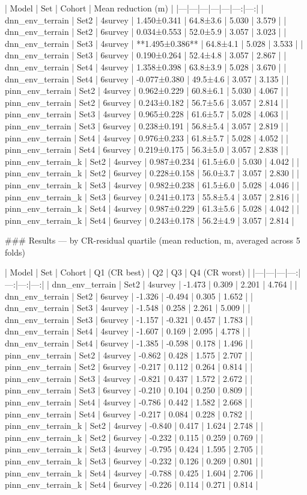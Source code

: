| Model | Set | Cohort | Mean reduction (m) | %
|---|---|---|---|---|---:|---:|
| dnn_env_terrain | Set2 | 4survey | 1.450±0.341 | 64.8±3.6 | 5.030 | 3.579 |
| dnn_env_terrain | Set2 | 6survey | 0.034±0.553 | 52.0±5.9 | 3.057 | 3.023 |
| dnn_env_terrain | Set3 | 4survey | **1.495±0.386** | 64.8±4.1 | 5.028 | 3.533 |
| dnn_env_terrain | Set3 | 6survey | 0.190±0.264 | 52.4±4.8 | 3.057 | 2.867 |
| dnn_env_terrain | Set4 | 4survey | 1.358±0.398 | 63.8±3.9 | 5.028 | 3.670 |
| dnn_env_terrain | Set4 | 6survey | -0.077±0.380 | 49.5±4.6 | 3.057 | 3.135 |
| pinn_env_terrain | Set2 | 4survey | 0.962±0.229 | 60.8±6.1 | 5.030 | 4.067 |
| pinn_env_terrain | Set2 | 6survey | 0.243±0.182 | 56.7±5.6 | 3.057 | 2.814 |
| pinn_env_terrain | Set3 | 4survey | 0.965±0.228 | 61.6±5.7 | 5.028 | 4.063 |
| pinn_env_terrain | Set3 | 6survey | 0.238±0.191 | 56.8±5.4 | 3.057 | 2.819 |
| pinn_env_terrain | Set4 | 4survey | 0.976±0.233 | 61.8±5.7 | 5.028 | 4.052 |
| pinn_env_terrain | Set4 | 6survey | 0.219±0.175 | 56.3±5.0 | 3.057 | 2.838 |
| pinn_env_terrain_k | Set2 | 4survey | 0.987±0.234 | 61.5±6.0 | 5.030 | 4.042 |
| pinn_env_terrain_k | Set2 | 6survey | 0.228±0.158 | 56.0±3.7 | 3.057 | 2.830 |
| pinn_env_terrain_k | Set3 | 4survey | 0.982±0.238 | 61.5±6.0 | 5.028 | 4.046 |
| pinn_env_terrain_k | Set3 | 6survey | 0.241±0.173 | 55.8±5.4 | 3.057 | 2.816 |
| pinn_env_terrain_k | Set4 | 4survey | 0.987±0.229 | 61.3±5.6 | 5.028 | 4.042 |
| pinn_env_terrain_k | Set4 | 6survey | 0.243±0.178 | 56.2±4.9 | 3.057 | 2.814 |

### Results — by CR-residual quartile (mean reduction, m, averaged across 5 folds)

| Model | Set | Cohort | Q1 (CR best) | Q2 | Q3 | Q4 (CR worst) |
|---|---|---|---:|---:|---:|---:|
| dnn_env_terrain | Set2 | 4survey | -1.473 | 0.309 | 2.201 | 4.764 |
| dnn_env_terrain | Set2 | 6survey | -1.326 | -0.494 | 0.305 | 1.652 |
| dnn_env_terrain | Set3 | 4survey | -1.548 | 0.258 | 2.261 | 5.009 |
| dnn_env_terrain | Set3 | 6survey | -1.157 | -0.321 | 0.457 | 1.783 |
| dnn_env_terrain | Set4 | 4survey | -1.607 | 0.169 | 2.095 | 4.778 |
| dnn_env_terrain | Set4 | 6survey | -1.385 | -0.598 | 0.178 | 1.496 |
| pinn_env_terrain | Set2 | 4survey | -0.862 | 0.428 | 1.575 | 2.707 |
| pinn_env_terrain | Set2 | 6survey | -0.217 | 0.112 | 0.264 | 0.814 |
| pinn_env_terrain | Set3 | 4survey | -0.821 | 0.437 | 1.572 | 2.672 |
| pinn_env_terrain | Set3 | 6survey | -0.210 | 0.104 | 0.250 | 0.809 |
| pinn_env_terrain | Set4 | 4survey | -0.786 | 0.442 | 1.582 | 2.668 |
| pinn_env_terrain | Set4 | 6survey | -0.217 | 0.084 | 0.228 | 0.782 |
| pinn_env_terrain_k | Set2 | 4survey | -0.840 | 0.417 | 1.624 | 2.748 |
| pinn_env_terrain_k | Set2 | 6survey | -0.232 | 0.115 | 0.259 | 0.769 |
| pinn_env_terrain_k | Set3 | 4survey | -0.795 | 0.424 | 1.595 | 2.705 |
| pinn_env_terrain_k | Set3 | 6survey | -0.232 | 0.126 | 0.269 | 0.801 |
| pinn_env_terrain_k | Set4 | 4survey | -0.788 | 0.425 | 1.604 | 2.706 |
| pinn_env_terrain_k | Set4 | 6survey | -0.226 | 0.114 | 0.271 | 0.814 |

